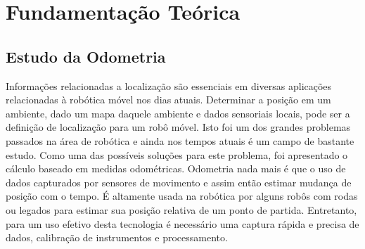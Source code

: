 \chapter{Fundamentação Teórica}
\label{chap:fundteor}





\section{Estudo da Odometria}
Informações relacionadas a localização são essenciais em diversas aplicações relacionadas à robótica móvel nos dias atuais. Determinar a posição em um ambiente, dado um mapa daquele ambiente e dados sensoriais locais, pode ser a definição de localização para um robô móvel. Isto foi um dos grandes problemas passados na área de robótica e ainda nos tempos atuais é um campo de bastante estudo.
Como uma das possíveis soluções para este problema, foi apresentado o cálculo baseado em medidas odométricas. Odometria nada mais é que o uso de dados capturados por sensores de movimento e assim então estimar mudança de posição com o tempo. É altamente usada na robótica por alguns robôs com rodas ou legados para estimar sua posição relativa de um ponto de partida. Entretanto, para um uso efetivo desta tecnologia é necessário uma captura rápida e precisa de dados, calibração de instrumentos e processamento.

